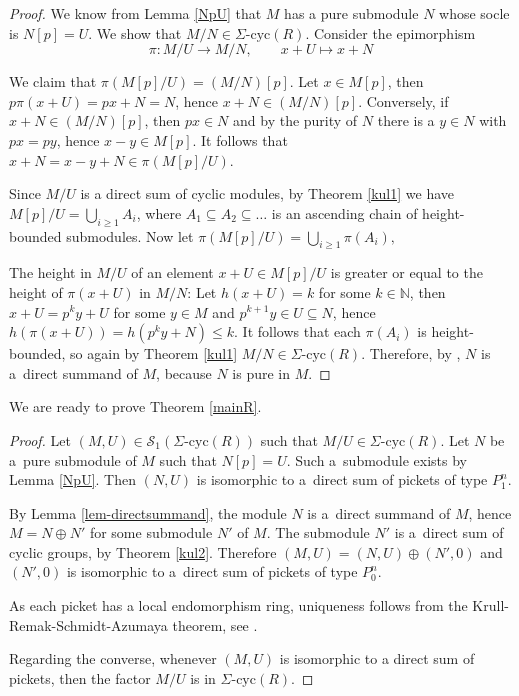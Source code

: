 \documentclass[twoside,leqno,12pt]{amsart}
\def\SigCyc{\mbox{$\Sigma$-cyc}}
\theoremstyle{definition}
\theoremstyle{remark}
\numberwithin{equation}{section}
\begin{document}
\begin{proof}
We know from Lemma \ref{NpU} that $M$ has a pure submodule $N$ whose socle is $N[p]=U$.
We show that $M/N\in\SigCyc(R)$. Consider the epimorphism
$$\pi:M/U\longrightarrow M/N,\qquad x+U\longmapsto x+N$$

We claim that $\pi(M[p]/U)=(M/N)[p]$. Let $x\in M[p]$, then $p\pi(x+U)=px+N=N$, hence $x+N\in (M/N)[p]$. Conversely, if $x+N\in (M/N)[p]$, then $px\in N$ and by the purity of $N$ there is a $y\in N$ with $px=py$, hence $x-y\in M[p]$. It follows that $x+N=x-y+N\in\pi(M[p]/U)$.

Since $M/U$ is a direct sum of cyclic modules, by Theorem \ref{kul1} we have $M[p]/U=\bigcup_{i\geq 1}A_i$, where $A_1\subseteq A_2\subseteq\ldots$ is an ascending chain of height-bounded submodules. Now let $\pi(M[p]/U)=\bigcup_{i\geq 1}\pi(A_i), \quad $

The height in $M/U$ of an element $x+U\in M[p]/U$ is greater or equal to the height of $\pi(x+U)$ in $M/N$: Let $h(x+U)=k$ for some $k\in\mathbb{N}$, then $x+U=p^k y+U$ for some $y\in M$ and $p^{k+1} y\in U\subseteq N$, hence $h(\pi(x+U))=h(p^k y+N)\leq k$.
It follows that each $\pi(A_i)$ is height-bounded, so again by Theorem \ref{kul1} $M/N\in\SigCyc(R)$.
Therefore, by \cite[Theorem 10.2, $(2)\Leftrightarrow(3)$]{kt}, $N$ is a~direct summand of $M$, because $N$ is pure in $M$. 
\end{proof}

We are ready to prove Theorem \ref{mainR}.

\begin{proof}
  Let $(M,U)\in\mathcal{S}_1(\SigCyc(R))$ such that $M/U\in\SigCyc(R)$.
  Let $N$ be a~pure submodule of $M$ such that $N[p]=U$.
  Such a~submodule exists by Lemma \ref{NpU}.
  Then $(N,U)$ is isomorphic to a~direct sum of pickets of type $P_1^n$.

  By Lemma \ref{lem-directsummand}, the module $N$ is a~direct summand of $M$,
  hence $M=N\oplus N'$ for some submodule $N'$ of $M$.
  The submodule $N'$ is a~direct sum of cyclic groups, by Theorem \ref{kul2}. Therefore $(M,U)=(N,U)\oplus (N',0)$ and $(N',0)$ is isomorphic to a~direct sum of pickets of type $P_0^n$.

  As each picket has a local endomorphism ring,
  uniqueness follows from the Krull-Remak-Schmidt-Azumaya theorem, see \cite{azu,fac}.

  Regarding the converse, whenever $(M,U)$ is isomorphic to a direct sum of pickets,
    then the factor $M/U$ is in $\SigCyc(R)$.
\end{proof}
\end{document}
